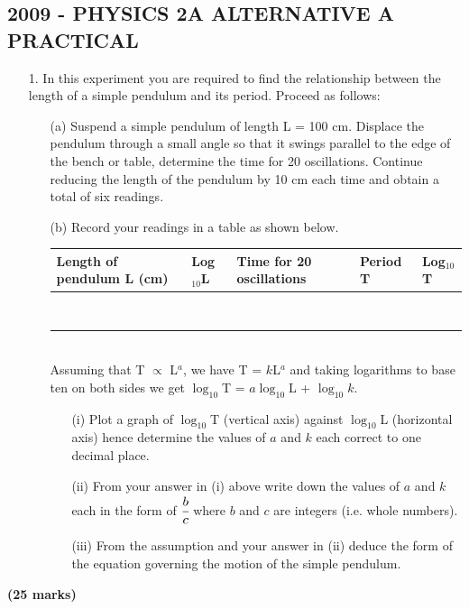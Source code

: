 \subsection{2009 - PHYSICS 2A ALTERNATIVE A PRACTICAL}

\begin{enumerate}
\item[1.] In this experiment you are required to find the relationship between the length of a simple pendulum and its period. Proceed as follows:
\begin{itemize}
\item[(a)] Suspend a simple pendulum of length L = 100 cm. Displace the pendulum through a small angle so that it swings parallel to the edge of the bench or table, determine the time for 20 oscillations. Continue reducing the length of the pendulum by 10 cm each time and obtain a total of six readings.
\item[(b)] Record your readings in a table as shown below.


\begin{tabular}{|p{2.5cm}|p{2.5cm}|p{2.5cm}|p{2.5cm}|p{2.5cm}|} \hline
Length of pendulum L (cm) & Log$_{10}$L & Time for 20 oscillations & Period T & Log$_{10}$T \\ \hline
&&&& \\ 
&&&& \\ 
&&&& \\ 
&&&& \\ 
&&&& \\ 
&&&& \\ 
&&&& \\ 
&&&& \\ \hline
\end{tabular}\\[10pt]

\noindent Assuming that T $ \propto $ L$^a$, we have T = $k$L$^a$ and taking logarithms to base ten on both sides we get $\log_{10}$T = $a\log_{10}$L + $\log_{10}k$.

\begin{itemize}
\item[(i)] Plot a graph of $\log_{10}$T (vertical axis) against $\log_{10}$L (horizontal axis) hence determine the values of $a$ and $k$ each correct to one decimal place.
\item[(ii)] From your answer in (i) above write down the values of $a$ and $k$ each in the form of $\cfrac{b}{c}$ where $b$ and $c$ are integers (i.e. whole numbers).
\item[(iii)] From the assumption and your answer in (ii) deduce the form of the equation governing the motion of the simple pendulum.
\end{itemize}

\end{itemize}
\end{enumerate}
\flushright \textbf{(25 marks)}


